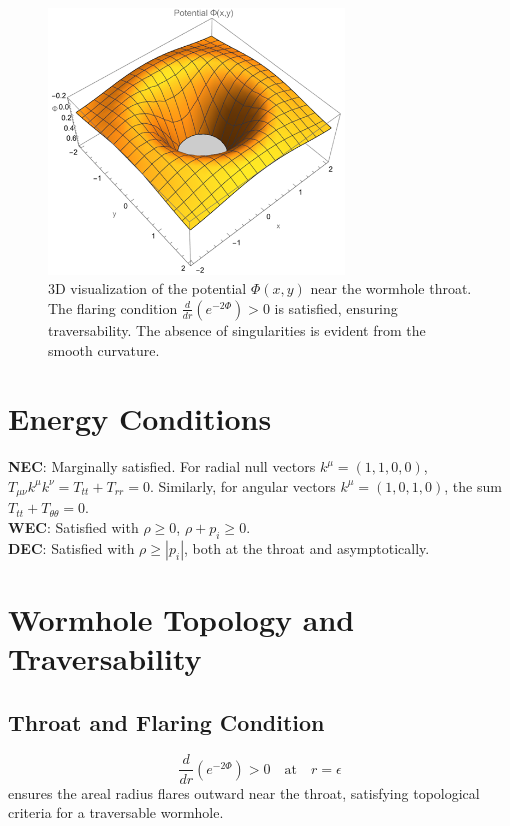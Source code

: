 \documentclass[12pt]{article}
\begin{document}
\begin{figure}[htbp]
    \centering
    \includegraphics[width=0.7\textwidth]{GeometryVisual.png}
    \caption{3D visualization of the potential \( \Phi(x, y) \) near the wormhole throat. The flaring condition \( \frac{d}{dr}(e^{-2\Phi}) > 0 \) is satisfied, ensuring traversability. The absence of singularities is evident from the smooth curvature.}
    \label{fig:geometry}
\end{figure}

\section{Energy Conditions}
\textbf{NEC}: Marginally satisfied. For radial null vectors \( k^\mu = (1,1,0,0) \), \( T_{\mu\nu}k^\mu k^\nu = T_{tt} + T_{rr} = 0 \). Similarly, for angular vectors \( k^\mu = (1,0,1,0) \), the sum \( T_{tt} + T_{\theta\theta} = 0 \).\\
\textbf{WEC}: Satisfied with \( \rho \geq 0 \), \( \rho + p_i \geq 0 \).\\
\textbf{DEC}: Satisfied with \( \rho \geq |p_i| \), both at the throat and asymptotically.

\section{Wormhole Topology and Traversability}
\subsection{Throat and Flaring Condition}
\[
\frac{d}{dr} \left( e^{-2\Phi} \right) > 0 \quad \text{at} \quad r = \epsilon
\]
ensures the areal radius flares outward near the throat, satisfying topological criteria for a traversable wormhole.
\end{document}
